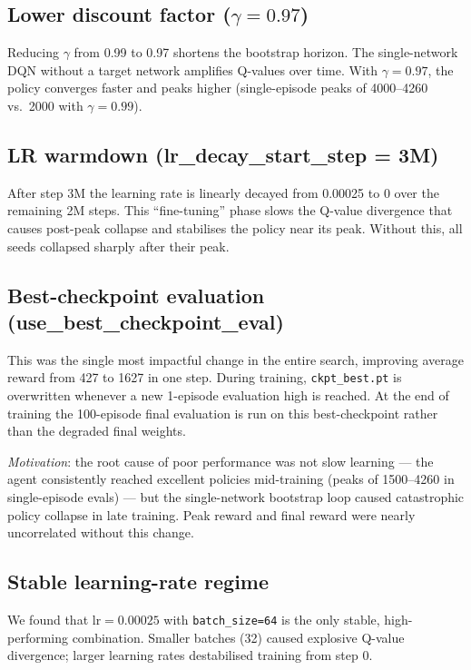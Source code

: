 \documentclass[11pt,a4paper]{article}
\begin{document}
\subsection{Lower discount factor ($\gamma = 0.97$)}
Reducing $\gamma$ from 0.99 to 0.97 shortens the bootstrap horizon. The single-network
DQN without a target network amplifies Q-values over time. With $\gamma = 0.97$, the
policy converges faster and peaks higher (single-episode peaks of 4000--4260 vs.\ 2000
with $\gamma = 0.99$).

\subsection{LR warmdown (lr\_decay\_start\_step = 3M)}
After step 3M the learning rate is linearly decayed from 0.00025 to 0 over the
remaining 2M steps. This ``fine-tuning'' phase slows the Q-value divergence that causes
post-peak collapse and stabilises the policy near its peak. Without this, all seeds
collapsed sharply after their peak.

\subsection{Best-checkpoint evaluation (use\_best\_checkpoint\_eval)}
This was the single most impactful change in the entire search, improving average reward
from 427 to 1627 in one step. During training, \texttt{ckpt\_best.pt} is overwritten
whenever a new 1-episode evaluation high is reached. At the end of training the 100-episode
final evaluation is run on this best-checkpoint rather than the degraded final weights.

\textit{Motivation}: the root cause of poor performance was not slow learning — the agent
consistently reached excellent policies mid-training (peaks of 1500--4260 in single-episode
evals) — but the single-network bootstrap loop caused catastrophic policy collapse in late
training. Peak reward and final reward were nearly uncorrelated without this change.

\subsection{Stable learning-rate regime}
We found that $\text{lr}=0.00025$ with \texttt{batch\_size=64} is the only stable,
high-performing combination. Smaller batches (32) caused explosive Q-value divergence;
larger learning rates destabilised training from step 0.

\end{document}
